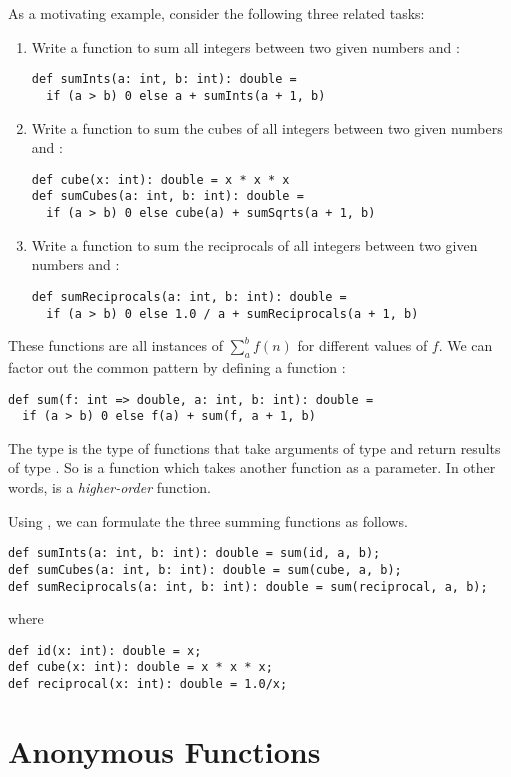As a motivating example, consider the following three related tasks:
\begin{enumerate}
\item
Write a function to sum all integers between two given numbers  and :
\begin{lstlisting}
def sumInts(a: int, b: int): double =
  if (a > b) 0 else a + sumInts(a + 1, b)
\end{lstlisting}
\item 
Write a function to sum the cubes of all integers between two given numbers 
 and :
\begin{lstlisting}
def cube(x: int): double = x * x * x
def sumCubes(a: int, b: int): double =
  if (a > b) 0 else cube(a) + sumSqrts(a + 1, b)
\end{lstlisting}
\item
Write a function to sum the reciprocals of all integers between two given numbers 
 and :
\begin{lstlisting}
def sumReciprocals(a: int, b: int): double =
  if (a > b) 0 else 1.0 / a + sumReciprocals(a + 1, b)
\end{lstlisting}
\end{enumerate}
These functions are all instances of
\(\sum^b_a f(n)\) for different values of $f$. 
We can factor out the common pattern by defining a function :
\begin{lstlisting}
def sum(f: int => double, a: int, b: int): double =
  if (a > b) 0 else f(a) + sum(f, a + 1, b)
\end{lstlisting}
The type  is the type of functions that
take arguments of type  and return results of type
. So  is a function which takes another function as 
a parameter. In other words,  is a {\em higher-order}
function.

Using , we can formulate the three summing functions as
follows.
\begin{lstlisting}
def sumInts(a: int, b: int): double = sum(id, a, b);
def sumCubes(a: int, b: int): double = sum(cube, a, b);
def sumReciprocals(a: int, b: int): double = sum(reciprocal, a, b);
\end{lstlisting}
where
\begin{lstlisting}
def id(x: int): double = x;
def cube(x: int): double = x * x * x;
def reciprocal(x: int): double = 1.0/x;
\end{lstlisting}

\section{Anonymous Functions}

